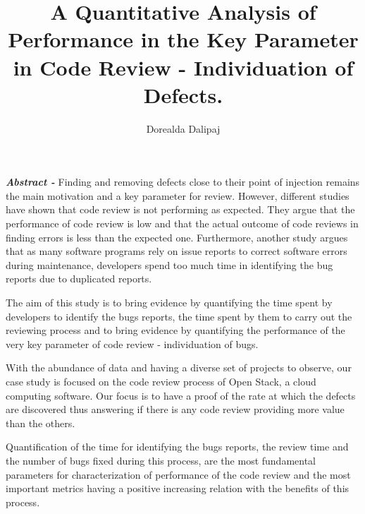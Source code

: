 \documentclass[ifip]{svmult}
\begin{document}
\title*{A Quantitative Analysis of Performance in the Key Parameter in Code Review - Individuation of Defects.}
\author{Dorealda Dalipaj}
%
%
\maketitle

\textbf{\textit{Abstract -}} Finding and removing defects close to their point of injection remains the main motivation and a key parameter
for review. However, different studies have shown that code review is not performing as expected. They argue that the performance of 
code review is low and that the actual outcome of code reviews in finding errors is less than the expected one. 
Furthermore, another study argues that as many software programs rely on issue reports to correct software errors during maintenance, 
developers spend too much time in identifying the bug reports due to duplicated reports.

The aim of this study is to bring evidence by quantifying the time spent by developers to identify the bugs reports, the time
spent by them to carry out the reviewing process and to bring evidence by quantifying the performance of the very key 
parameter of code review - individuation of bugs.

With the abundance of data and having a diverse set of projects to observe, our case study is focused on the code review process 
of Open Stack, a cloud computing software. 
Our focus is to have a proof of the rate at which the defects are discovered 
thus answering if there is any code review providing more value than the others. 

Quantification of the time for identifying the bugs reports, the review time and the number of bugs fixed during this process, 
are the most fundamental parameters for characterization of performance of the code review and the most important metrics having 
a positive increasing relation with the benefits of this process.
\end{document}
